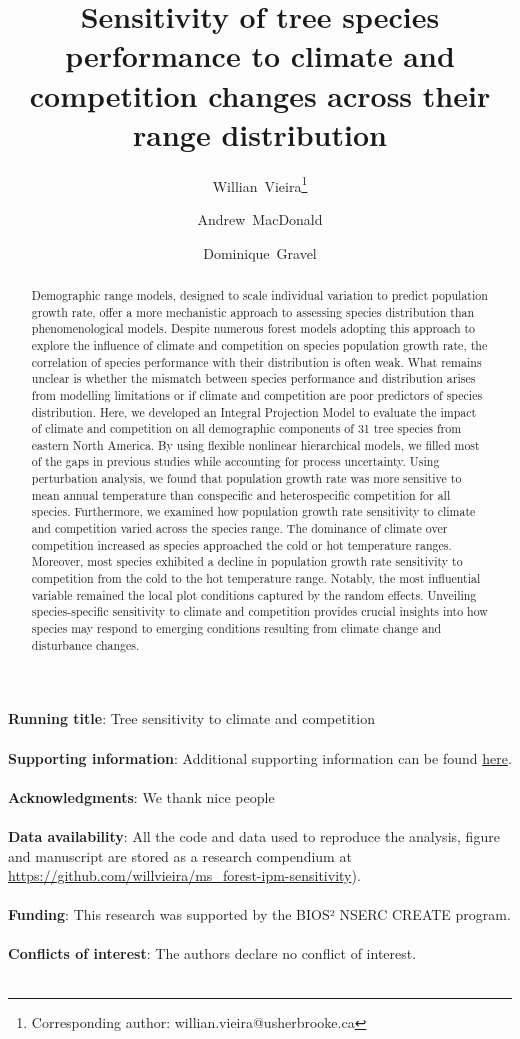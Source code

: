 \documentclass[12pt]{article}
\title{Sensitivity of tree species performance to climate and
competition changes across their range distribution}
\author[1]{Willian~Vieira\thanks{Corresponding author: willian.vieira@usherbrooke.ca}}
\author[1]{Andrew~MacDonald}
\author[1]{Dominique~Gravel}
\affil[1]{Département de biologie, Université de Sherbrooke, Sherbrooke,
QC, Canada}
\date{}
\begin{document}
\maketitle
\small{{\bf Running title}: Tree sensitivity to climate and
competition}\\\\
\small{{\bf Supporting information}: Additional supporting information can be found \href{https://willvieira.github.io/ms\_forest-ipm-sensitivity/suppInfo.pdf}{here}.}\\\\
\small{{\bf Acknowledgments}: We thank nice people}\\\\
\small{{\bf Data availability}: All the code and data used to reproduce
the analysis, figure and manuscript are stored as a research compendium
at \url{https://github.com/willvieira/ms_forest-ipm-sensitivity}).}\\\\
\small{{\bf Funding}: This research was supported by the BIOS² NSERC
CREATE program.}\\\\
\small{{\bf Conflicts of interest}: The authors declare no conflict of
interest.}\\\\
\begin{abstract}
Demographic range models, designed to scale individual variation to
predict population growth rate, offer a more mechanistic approach to
assessing species distribution than phenomenological models. Despite
numerous forest models adopting this approach to explore the influence
of climate and competition on species population growth rate, the
correlation of species performance with their distribution is often
weak. What remains unclear is whether the mismatch between species
performance and distribution arises from modelling limitations or if
climate and competition are poor predictors of species distribution.
Here, we developed an Integral Projection Model to evaluate the impact
of climate and competition on all demographic components of 31 tree
species from eastern North America. By using flexible nonlinear
hierarchical models, we filled most of the gaps in previous studies
while accounting for process uncertainty. Using perturbation analysis,
we found that population growth rate was more sensitive to mean annual
temperature than conspecific and heterospecific competition for all
species. Furthermore, we examined how population growth rate sensitivity
to climate and competition varied across the species range. The
dominance of climate over competition increased as species approached
the cold or hot temperature ranges. Moreover, most species exhibited a
decline in population growth rate sensitivity to competition from the
cold to the hot temperature range. Notably, the most influential
variable remained the local plot conditions captured by the random
effects. Unveiling species-specific sensitivity to climate and
competition provides crucial insights into how species may respond to
emerging conditions resulting from climate change and disturbance
changes.
\end{abstract}
\end{document}
